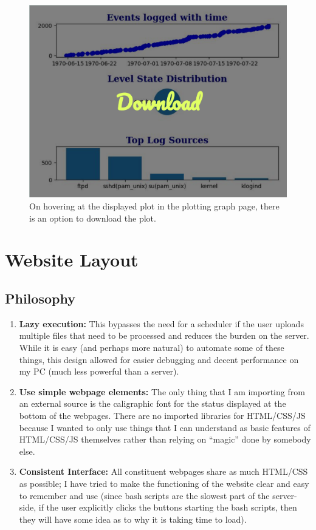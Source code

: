 \documentclass[11pt]{scrartcl}
\begin{document}
\begin{figure}
  
  \centering
  \includegraphics[width=0.8\linewidth]{images/downloadplot.png}
  \caption{On hovering at the displayed plot in the plotting graph page, there
  is an option to download the plot.}
  \label{downloadplot}

\end{figure}



\section{Website Layout}

\subsection{Philosophy}
\label{philo}

\begin{enumerate} 
  \item \textbf{Lazy execution:} This bypasses the need for a
  scheduler if the user uploads multiple files that need to be processed and
  reduces the burden on the server. While it is easy (and perhaps more natural)
  to automate some of these things, this design allowed for easier debugging and
  decent performance on my PC (much less powerful than a server).

  \item \textbf{Use simple webpage elements:} The only thing that I am
  importing from an external source is the caligraphic font for the status
  displayed at the bottom of the webpages. There are no imported libraries for 
  HTML/CSS/JS because I wanted to only use things that I can understand as basic
  features of HTML/CSS/JS themselves rather than relying on ``magic'' done by
  somebody else.

  \item \textbf{Consistent Interface:} All constituent webpages share as much
    HTML/CSS as possible; I have tried to make the functioning of the website
    clear and easy to remember and use (since bash scripts are the slowest part
    of the server-side, if the user explicitly clicks the buttons starting the
    bash scripts, then they will have some idea as to why it is taking time to
    load).
\end{enumerate}
\end{document}
